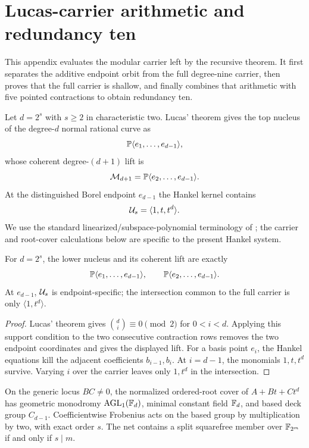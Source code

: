\section{Lucas-carrier arithmetic and redundancy ten}\label{sec:lucas}

This appendix evaluates the modular carrier left by the recursive theorem.
It first separates the additive endpoint orbit from the full degree-nine
carrier, then proves that the full carrier is shallow, and finally combines
that arithmetic with five pointed contractions to obtain redundancy ten.

Let $d=2^s$ with $s\geq2$ in characteristic two.  Lucas' theorem gives the top
nucleus of the degree-$d$ normal rational curve as
\[
 \mathbb P\langle e_1,\ldots,e_{d-1}\rangle,
\]
whose coherent degree-$(d+1)$ lift is
\[
 \mathcal M_{d+1}=\mathbb P\langle e_2,\ldots,e_{d-1}\rangle.
\]
At the distinguished Borel endpoint $e_{d-1}$ the Hankel kernel
contains
\[
       \mathcal U_s=\langle1,t,t^d\rangle.
\]
We use the standard linearized/subspace-polynomial terminology of
\cite{LidlNiederreiter1996,BenSassonEtAl2016}; the carrier and
root-cover calculations below are specific to the present Hankel
system.

\begin{proposition}\label{prop:lucas-kernel}%
%
For $d=2^s$, the lower nucleus and its coherent lift are exactly
\[
\mathbb P\langle e_1,\ldots,e_{d-1}\rangle,\qquad
\mathbb P\langle e_2,\ldots,e_{d-1}\rangle.
\]
At $e_{d-1}$, $\mathcal U_s$ is endpoint-specific; the intersection common to
the full carrier is only $\langle1,t^d\rangle$.
\end{proposition}

\begin{proof}
Lucas' theorem gives
$\binom di\equiv0\pmod2$ for $0<i<d$.  Applying this support condition
to the two consecutive contraction rows removes the two endpoint
coordinates and gives the displayed lift.  For a basis point $e_i$,
the Hankel equations kill the adjacent coefficients $b_{i-1},b_i$.
At $i=d-1$, the monomials $1,t,t^d$ survive.  Varying $i$ over the
carrier leaves only $1,t^d$ in the intersection.
\end{proof}

\begin{proposition}\label{prop:linearized}%
%
%
On the generic locus $BC\ne0$, the normalized ordered-root cover of
$A+Bt+Ct^d$ has geometric
monodromy $\operatorname{AGL}_1(\mathbb F_d)$, minimal constant field
$\mathbb F_d$, and based deck group $C_{d-1}$.  Coefficientwise Frobenius acts
on the based group by multiplication by two, with exact order $s$.
The net contains a split squarefree member over $\mathbb F_{2^m}$ if and only
if $s\mid m$.
\end{proposition}

